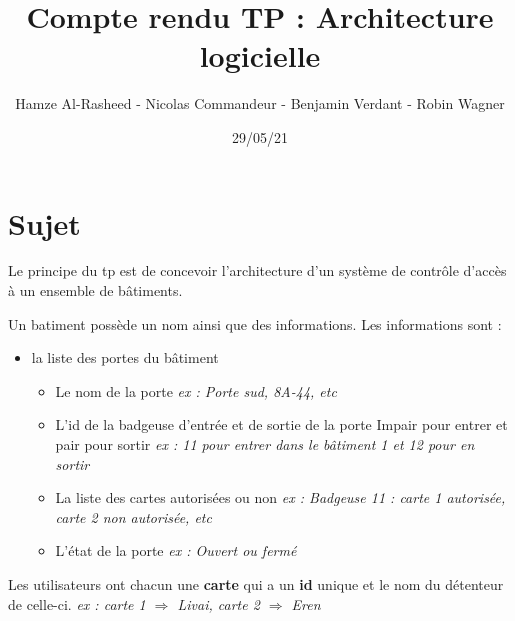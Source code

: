 \documentclass[a4paper,10pt]{article}
\title{Compte rendu TP : Architecture logicielle}
\date{29/05/21}
\author{Hamze Al-Rasheed - Nicolas Commandeur - Benjamin Verdant - Robin Wagner}
\begin{document}
    \maketitle
    \newpage
    \tableofcontents
    \newpage
    
    \section{Sujet}
        Le principe du tp est de concevoir l'architecture d'un système de contrôle d'accès à un ensemble de bâtiments.
    
        Un batiment possède un nom ainsi que des informations. Les informations sont :
        \begin{itemize}
            \item la liste des portes du bâtiment
            \begin{itemize}
                \item Le nom de la porte    \newline
                \textit{ex : Porte sud, 8A-44, etc}
                \item L'id de la badgeuse d'entrée et de sortie de la porte
                \newline
                Impair pour entrer et pair pour sortir \newline
                \textit{ex : 11 pour entrer dans le bâtiment 1 et 12 pour en sortir}
                \item La liste des cartes autorisées ou non 
                \newline
                \textit{ex : Badgeuse 11 : carte 1 autorisée, carte 2 non autorisée, etc}
                \item L'état de la porte
                \newline
                \textit{ex : Ouvert ou fermé}
            \end{itemize}
        \end{itemize}
        
        Les utilisateurs ont chacun une \textbf{carte} qui a un \textbf{id} unique et le nom du détenteur de celle-ci.
        \newline
        \textit{ex : carte 1 $\Rightarrow$ Livai, carte 2 $\Rightarrow$ Eren }
\end{document}
